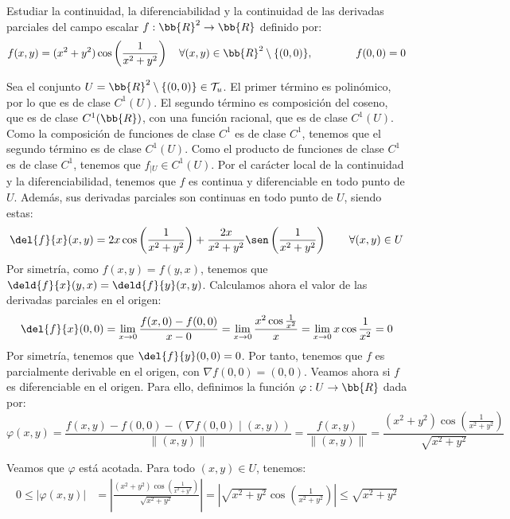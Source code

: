\begin{ejercicio}
    Estudiar la continuidad, la diferenciabilidad y la continuidad de las derivadas parciales del campo escalar $f: \bb{R}^2 \to \bb{R}$ definido por:
    \begin{equation*}
        f(x,y)=(x^2+y^2)\cos\left(\frac{1}{x^2+y^2}\right) \quad \forall (x,y)\in \bb{R}^2\setminus \{(0,0)\},\qquad\qquad f(0,0)=0
    \end{equation*}

    Sea el conjunto $U=\bb{R}^2\setminus \{(0,0)\}\in \mathcal{T}_u$. El primer término es polinómico, por lo que es de clase $C^1(U)$.
    El segundo término es composición del coseno, que es de clase $C^1(\bb{R})$, con una función racional, que es de clase $C^1(U)$.
    Como la composición de funciones de clase $C^1$ es de clase $C^1$, tenemos que el segundo término es de clase $C^1(U)$.
    Como el producto de funciones de clase $C^1$ es de clase $C^1$, tenemos que $f_{\big| U}\in C^1(U)$.
    Por el carácter local de la continuidad y la diferenciabilidad, tenemos que $f$ es continua y diferenciable en todo punto de $U$. Además, sus derivadas parciales son continuas en todo punto de $U$, siendo estas:
    \begin{gather*}
        \del{f}{x}(x,y) = 2x\cos\left(\frac{1}{x^2+y^2}\right) + \frac{2x}{x^2+y^2}\sen\left(\frac{1}{x^2+y^2}\right) \qquad \forall (x,y)\in U \\
    \end{gather*}
    Por simetría, como $f(x,y)=f(y,x)$, tenemos que $\deld{f}{x}(y,x)=\deld{f}{y}(x,y)$. Calculamos ahora el valor de las derivadas parciales en el origen:
    \begin{equation*}
        \del{f}{x}(0,0) = \lim_{x\to 0} \frac{f(x,0) - f(0,0)}{x-0} = \lim_{x\to 0} \frac{x^2\cos\frac{1}{x^2}}{x} = \lim_{x\to 0} x\cos\frac{1}{x^2} = 0
    \end{equation*}
    Por simetría, tenemos que $\del{f}{y}(0,0)=0$. Por tanto, tenemos que $f$ es parcialmente derivable en el origen, con
    $\nabla f(0,0) = (0,0)$. Veamos ahora si $f$ es diferenciable en el origen. Para ello, definimos la función $\varphi:U\to \bb{R}$ dada por:
    \begin{equation*}
        \varphi(x,y) = \frac{f(x,y) - f(0,0) - (\nabla f(0,0)\mid (x,y))}{\|(x,y)\|}
        = \frac{f(x,y)}{\|(x,y)\|} = \frac{(x^2+y^2)\cos\left(\frac{1}{x^2+y^2}\right)}{\sqrt{x^2+y^2}}
    \end{equation*}

    Veamos que $\varphi$ está acotada. Para todo $(x,y)\in U$, tenemos:
    \begin{equation*}\begin{split}
        0\leq |\varphi(x,y)| &=
        \left|\frac{(x^2+y^2)\cos\left(\frac{1}{x^2+y^2}\right)}{\sqrt{x^2+y^2}}\right|
        = \left|\sqrt{x^2+y^2}\cos\left(\frac{1}{x^2+y^2}\right)\right| \leq \sqrt{x^2+y^2}
    \end{split}\end{equation*}


\end{ejercicio}
